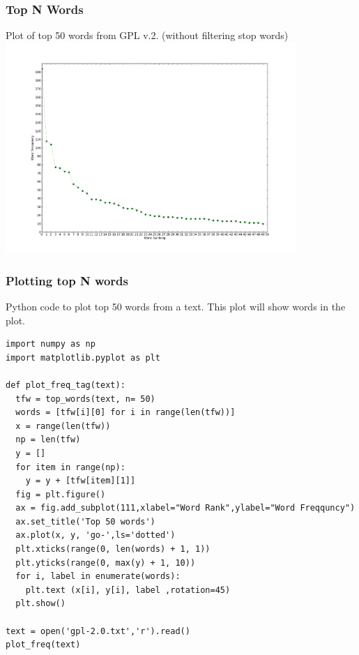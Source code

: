 \documentclass[serif,11pt,aspectratio=1610,table]{beamer}
\begin{document}
\begin{frame}
 \frametitle{Top N Words}
\small{Plot of top 50 words from GPL v.2. (without filtering stop words)} \\
\includegraphics[height=8cm]{freq.png}
\end{frame}

\begin{frame}[fragile]
 \frametitle{Plotting top N words}
Python code to plot top 50 words from a text. This plot will show words in the plot.
\tiny
\begin{verbatim}
import numpy as np
import matplotlib.pyplot as plt

def plot_freq_tag(text):
  tfw = top_words(text, n= 50)
  words = [tfw[i][0] for i in range(len(tfw))]
  x = range(len(tfw))
  np = len(tfw)
  y = []
  for item in range(np):
    y = y + [tfw[item][1]]
  fig = plt.figure()
  ax = fig.add_subplot(111,xlabel="Word Rank",ylabel="Word Freqquncy")
  ax.set_title('Top 50 words')
  ax.plot(x, y, 'go-',ls='dotted')
  plt.xticks(range(0, len(words) + 1, 1))
  plt.yticks(range(0, max(y) + 1, 10))
  for i, label in enumerate(words):
    plt.text (x[i], y[i], label ,rotation=45)
  plt.show()

text = open('gpl-2.0.txt','r').read()
plot_freq(text)
\end{verbatim}
\end{frame}
\end{document}

